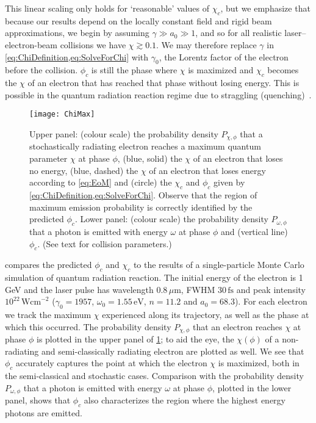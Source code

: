 \documentclass[reprint,superscriptaddress,amsmath,amssymb,aps,pra]{revtex4-1}
\newcommand{\micron}{{\mu\mathrm{m}}}
\newcommand{\Wcm}{\mathrm{Wcm}}
\newcommand{\fs}{\mathrm{fs}}
\newcommand{\eV}{\mathrm{eV}}
\begin{document}
This linear scaling only holds for `reasonable' values of $\chi_c$,
but we emphasize that because our results depend on the locally
constant field and rigid beam approximations, we begin by assuming
$\gamma \gg a_0 \gg 1$, and so for all realistic laser--electron-beam
collisions we have $\chi \gtrsim 0.1$.
We may therefore replace $\gamma$ in \cref{eq:ChiDefinition,eq:SolveForChi}
with $\gamma_0$, the Lorentz factor of the electron before the collision.
$\phi_c$ is still the phase where $\chi$ is maximized and $\chi_c$ becomes
the $\chi$ of an electron that has reached that phase without losing energy.
This is possible in the quantum radiation reaction regime due to straggling
(quenching)~\cite{ShenWhite,Harvey}.

	\begin{figure}
	\texttt{[image: ChiMax]}
	\caption[Maximum $\chi$]
		{Upper panel: (colour scale) the probability density $P_{\chi,\phi}$
		that a stochastically radiating electron reaches a maximum
		quantum parameter $\chi$ at phase $\phi$, (blue, solid) the
		$\chi$ of an electron that loses no energy, (blue, dashed)
		the $\chi$ of an electron that loses energy according to
		\cref{eq:EoM} and (circle) the $\chi_c$ and $\phi_c$ given by
		\cref{eq:ChiDefinition,eq:SolveForChi}.
		Observe that the region of maximum emission probability is
		correctly identified by the predicted $\phi_c$.
		Lower panel: (colour scale) the probability density $P_{\omega,\phi}$
		that a 	photon is emitted with energy $\omega$ at phase $\phi$ and
		(vertical line) $\phi_c$. (See text for collision parameters.)}
	\label{fig:ChiMax}
	\end{figure}

 compares the predicted $\phi_c$ and $\chi_c$ to the
results of a single-particle Monte Carlo simulation of quantum radiation
reaction. The initial energy of the electron is 1\,GeV and the laser pulse
has wavelength $0.8\,\micron$, FWHM $30\,\fs$ and peak intensity
$10^{22}\,\Wcm^{-2}$ ($\gamma_0 = 1957$, $\omega_0 = 1.55\,\eV$, $n = 11.2$
and $a_0 = 68.3$). For each electron we track the maximum $\chi$
experienced along its trajectory, as well as the phase at which this
occurred. The probability density $P_{\chi,\phi}$ that an electron reaches
$\chi$ at phase $\phi$ is plotted in the upper panel of \cref{fig:ChiMax};
to aid the eye, the $\chi(\phi)$ of a non-radiating and semi-classically
radiating electron are plotted as well. We see that $\phi_c$ accurately
captures the point at which the electron $\chi$ is maximized, both in
the semi-classical and stochastic cases. Comparison with the probability
density $P_{\omega,\phi}$ that a photon is emitted with energy $\omega$
at phase $\phi$, plotted in the lower panel, shows that $\phi_c$ also
characterizes the region where the highest energy photons are emitted.
\end{document}
